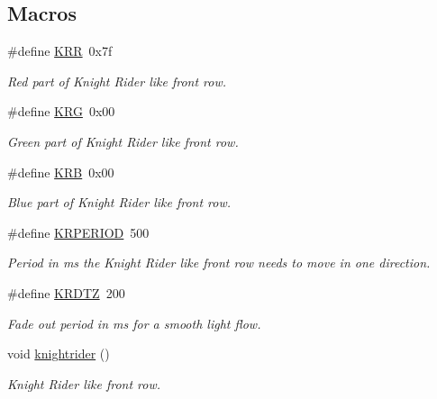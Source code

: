 \subsection*{Macros}
\begin{DoxyCompactItemize}
\item 
\#define \hyperlink{group__knightrider_ga5d96b8b7a94cd393a11cca853832350f}{K\+RR}~0x7f
\begin{DoxyCompactList}\small\item\em Red part of Knight Rider like front row. \end{DoxyCompactList}\item 
\#define \hyperlink{group__knightrider_ga47a5cb8daecea854270c0d09c3ebc24c}{K\+RG}~0x00
\begin{DoxyCompactList}\small\item\em Green part of Knight Rider like front row. \end{DoxyCompactList}\item 
\#define \hyperlink{group__knightrider_gaa315fefb5665924b7d512104bc3965cd}{K\+RB}~0x00
\begin{DoxyCompactList}\small\item\em Blue part of Knight Rider like front row. \end{DoxyCompactList}\item 
\#define \hyperlink{group__knightrider_gadb436e031abc2aed3e3cbbf9078667bb}{K\+R\+P\+E\+R\+I\+OD}~500
\begin{DoxyCompactList}\small\item\em Period in ms the Knight Rider like front row needs to move in one direction. \end{DoxyCompactList}\item 
\#define \hyperlink{group__knightrider_ga64a0c208656bb11ad944489886089b7e}{K\+R\+D\+TZ}~200
\begin{DoxyCompactList}\small\item\em Fade out period in ms for a smooth light flow. \end{DoxyCompactList}\end{DoxyCompactItemize}
\begin{DoxyCompactItemize}
\item 
void \hyperlink{group__knightrider_ga58bfb7b9f8fcf7a4b02700359057a6f4}{knightrider} ()
\begin{DoxyCompactList}\small\item\em Knight Rider like front row. \end{DoxyCompactList}\end{DoxyCompactItemize}


